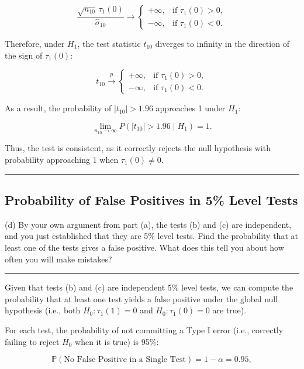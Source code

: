 \documentclass{article}
\newenvironment{colorparagraph}[1]{\par\color{#1}}{\par}
\begin{document}
\[
\frac{\sqrt{n_{10}} \, \tau_1(0)}{\hat{\sigma}_{10}} \to
\begin{cases}
+\infty, & \text{if } \tau_1(0) > 0, \\
-\infty, & \text{if } \tau_1(0) < 0.
\end{cases}
\]

Therefore, under \( H_1 \), the test statistic \( t_{10} \) diverges to infinity in the direction of the sign of \( \tau_1(0) \):

\[
t_{10} \xrightarrow{p}
\begin{cases}
+\infty, & \text{if } \tau_1(0) > 0, \\
-\infty, & \text{if } \tau_1(0) < 0.
\end{cases}
\]

As a result, the probability of \( |t_{10}| > 1.96 \) approaches 1 under \( H_1 \):

\[
\lim_{n_{10} \to \infty} P\left( |t_{10}| > 1.96 \mid H_1 \right) = 1.
\]

Thus, the test is consistent, as it correctly rejects the null hypothesis with probability approaching 1 when \( \tau_1(0) \neq 0 \).

\begin{colorparagraph}{questioncolor}
\rule{\textwidth}{0.5pt}

\label{q1d}\subsection{Probability of False Positives in 5\% Level Tests}
(d) By your own argument from part (a), the tests (b) and (c) are independent, and you just established that they are 5\% level tests. Find the probability that at least one of the tests gives a false positive. What does this tell you about how often you will make mistakes?

\rule{\textwidth}{0.5pt}
\end{colorparagraph}

Given that tests (b) and (c) are independent 5\% level tests, we can compute the probability that at least one test yields a false positive under the global null hypothesis (i.e., both \( H_0: \tau_1(1) = 0 \) and \( H_0: \tau_1(0) = 0 \) are true).

For each test, the probability of not committing a Type I error (i.e., correctly failing to reject \( H_0 \) when it is true) is 95\%:

\[
\mathbb{P}(\text{No False Positive in a Single Test}) = 1 - \alpha = 0.95,
\]
\end{document}
